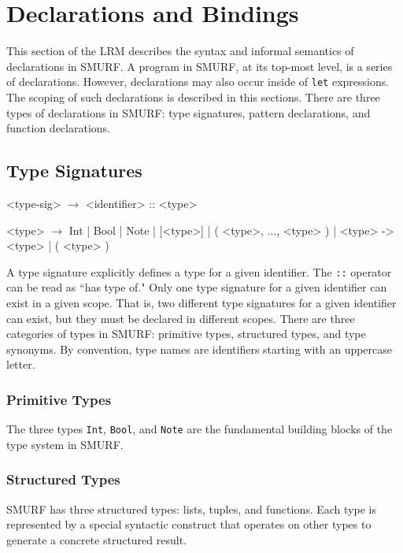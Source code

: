 \section{Declarations and Bindings}

This section of the LRM describes the syntax and informal semantics of
declarations in SMURF. A program in SMURF, at its top-most level, is a
series of declarations. However, declarations may also occur inside of
\texttt{let} expressions. The scoping of such declarations is described 
in this sections. There are three types of declarations in SMURF: 
type signatures, pattern declarations, and function declarations.

\subsection{Type Signatures}

\begin{grammar}

<type-sig> $\rightarrow$ <identifier> :: <type>

<type> $\rightarrow$ Int | Bool | Note | [<type>] | 
										( <type>, $\ldots$, <type> ) | <type> -> <type> | ( <type> )
										

\end{grammar}

A type signature explicitly defines a type for a given identifier. The
\texttt{::} operator can be read as ``has type of." Only one type signature
for a given identifier can exist in a given scope. That is, two different
type signatures for a given identifier can exist, but they must be declared
in different scopes. There are three categories of types in SMURF: primitive
types,  structured types, and type synonyms. By convention, type
names are identifiers starting with an uppercase letter.

\subsubsection{Primitive Types}

The three types \texttt{Int}, \texttt{Bool}, and \texttt{Note} are
the fundamental building blocks of the type system in SMURF. 

\subsubsection{Structured Types}

SMURF has three structured types: lists, tuples, and functions. Each
type is represented by a special syntactic construct that operates on
other types to generate a concrete structured result.

